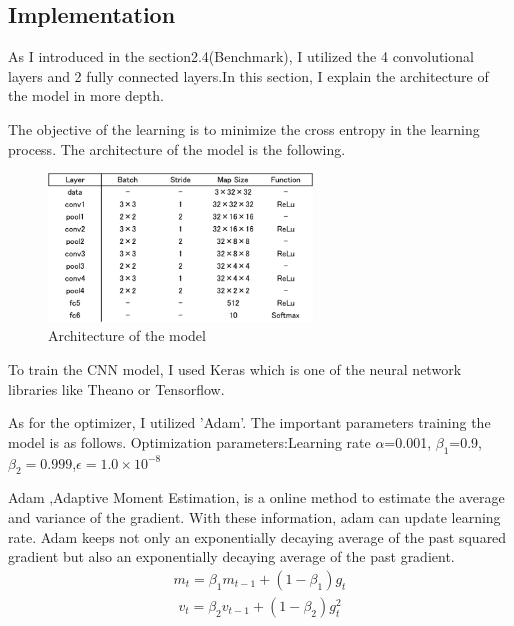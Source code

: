 \subsection{Implementation}


As I introduced in the section2.4(Benchmark), I utilized the 4 convolutional layers and 2 fully connected layers.In this section, I explain the architecture of the model in more depth.

The objective of the learning is to minimize the cross entropy in the learning process.
The architecture of the model is the following.

 \begin{figure}[H]

	\begin{center}
	\includegraphics[width=7cm]{picture/layer_architecture.png}
	\caption{Architecture of the model}
	\end{center}
	\label{fig:9}

\end{figure}


To train the CNN model, I used Keras which is one of the neural network libraries like Theano or Tensorflow.

As for the optimizer, I utilized 'Adam'. The important parameters training the model is as follows.
Optimization parameters:Learning rate $\alpha$=0.001, $\beta_{1}$=0.9,$\beta_{2}=0.999$,$\epsilon=1.0\times10^{-8}$\cite{Adam}

Adam ,Adaptive Moment Estimation, is a online method to estimate the average and variance of the gradient. With these information, adam can update learning rate. Adam keeps not only an exponentially decaying average of the past squared gradient but also an exponentially decaying average of the past gradient.
\begin{eqnarray}
 m_{t}=\beta_{1}m_{t-1}+(1-\beta_{1})g_{t}
 \end{eqnarray}
\begin{eqnarray}
v_{t}=\beta_{2}v_{t-1}+(1-\beta_{2})g^{2}_{t}
\end{eqnarray}



